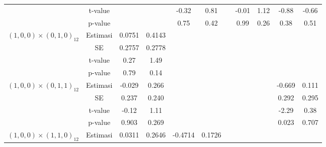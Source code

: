 \begin{enumerate}[label=\alph*.]
\begin{longtable}{|c|c|c|c|c|c|c|c|c|c|c|}
            & t-value
            & {} & {}
            & {-0.32} & {0.81} & {}
            & {-0.01} & {1.12}
            & {-0.88} & {-0.66} \\ \cline{2-11}

            & p-value
            & {} & {}
            & {0.75} & {0.42} & {}
            & {0.99} & {0.26}
            & {0.38} & {0.51} \\ \hline

            \multirow{4}{*}{$(1,0,0)\times(0,1,0)_{12}$}
            & Estimasi
            & {0.0751} & {0.4143}
            & {} & {} & {}
            & {} & {}
            & {} & {} \\ \cline{2-11}

            & SE
            & {0.2757} & {0.2778}
            & {} & {} & {}
            & {} & {}
            & {} & {} \\ \cline{2-11}

            & t-value
            & {0.27} & {1.49}
            & {} & {} & {}
            & {} & {}
            & {} & {} \\ \cline{2-11}

            & p-value
            & {0.79} & {0.14}
            & {} & {} & {}
            & {} & {}
            & {} & {} \\ \hline

            \multirow{4}{*}{$(1,0,0)\times(0,1,1)_{12}$}
            & Estimasi
            & {-0.029} & {0.266}
            & {} & {} & {}
            & {} & {}
            & {-0.669} & {0.111} \\ \cline{2-11}

            & SE
            & {0.237} & {0.240}
            & {} & {} & {}
            & {} & {}
            & {0.292} & {0.295} \\ \cline{2-11}

            & t-value
            & {-0.12} & {1.11}
            & {} & {} & {}
            & {} & {}
            & {-2.29} & {0.38} \\ \cline{2-11}

            & p-value
            & {0.903} & {0.269}
            & {} & {} & {}
            & {} & {}
            & {0.023} & {0.707} \\ \hline

            \multirow{4}{*}{$(1,0,0)\times(1,1,0)_{12}$}
            & Estimasi
            & {0.0311} & {0.2646}
            & {-0.4714} & {0.1726} & {}
            & {} & {}
            & {} & {} \\ \cline{2-11}


\end{longtable}
\end{enumerate}
